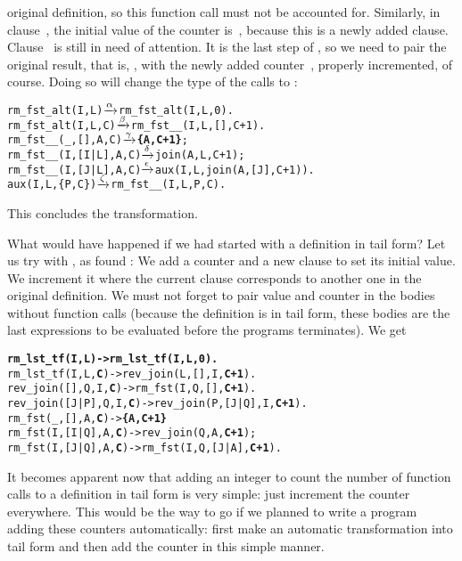 original definition, so this function call must not be accounted
for. Similarly, in clause~\clause{\alpha}, the initial value of the
counter is~, because this is a newly added
clause. Clause~\clause{\gamma} is still in need of attention. It is
the last step of , so we need to pair the
original result, that is, , with the newly added
counter~, properly incremented, of course. Doing so will
change the type of the calls to :
\begin{alltt}
rm_fst_alt(I,L)       \(\smashedrightarrow{\alpha}\) rm_fst_alt(I,L,0).
rm_fst_alt(I,L,C)     \(\smashedrightarrow{\beta}\) rm_fst__(I,L,[],C+1).
rm_fst__(_,   [],A,C) \(\smashedrightarrow{\gamma}\) \textbf{\{A,C+1\}};
rm_fst__(I,[I|L],A,C) \(\smashedrightarrow{\delta}\) join(A,L,C+1);
rm_fst__(I,[J|L],A,C) \(\smashedrightarrow{\epsilon}\) aux(I,L,join(A,[J],C+1)).
aux(I,L,\{P,C\})        \(\smashedrightarrow{\zeta}\) rm_fst__(I,L,P,C).
\end{alltt}
This concludes the transformation.

What would have happened if we had started with a definition in tail
form? Let us try with , as found
:  We add a
counter and a new clause to set its initial value. We increment it
where the current clause corresponds to another one in the original
definition. We must not forget to pair value and counter in the bodies
without function calls (because the definition is in tail form, these
bodies are the last expressions to be evaluated before the programs
terminates). We get\label{code:count_tf}
\begin{alltt}
\textbf{rm_lst_tf(I,L)        -> rm_lst_tf(I,L,0).}
rm_lst_tf(I,L,\textbf{C})      -> rev_join(L,[],I,\textbf{C+1}).
rev_join(   [],Q,I,\textbf{C}) -> rm_fst(I,Q,[],\textbf{C+1}).
rev_join([J|P],Q,I,\textbf{C}) -> rev_join(P,[J|Q],I,\textbf{C+1}).
rm_fst(_,   [],A,\textbf{C})   -> \textbf{\{A,C+1\}}
rm_fst(I,[I|Q],A,\textbf{C})   -> rev_join(Q,A,\textbf{C+1});
rm_fst(I,[J|Q],A,\textbf{C})   -> rm_fst(I,Q,[J|A],\textbf{C+1}).
\end{alltt}
It becomes apparent now that adding an integer to count the number of
function calls to a definition in tail form is very simple: just
increment the counter everywhere. This would be the way to go if we
planned to write a program adding these counters automatically: first
make an automatic transformation into tail form and then add the
counter in this simple manner.

